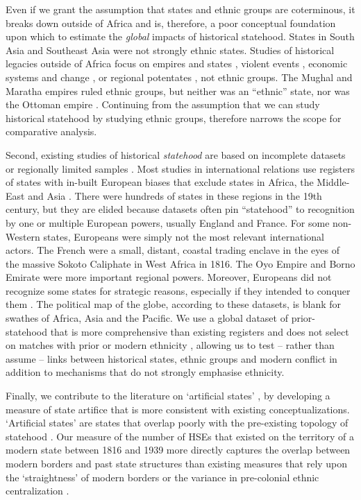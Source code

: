 Even if we grant the assumption that states and ethnic groups are coterminous,
it breaks down outside of Africa and is, therefore, a poor conceptual foundation
upon which to estimate the \textit{global} impacts of historical statehood.
States in South Asia and Southeast Asia were not strongly ethnic states. Studies
of historical legacies outside of Africa focus on empires and states
\citep{Acemoglu2011, Grosjean2011}, violent events \citep{Grosfeld2013},
economic systems and change \citep{Banerjee2005, Nunn2011}, or regional potentates \citep{Mazzuca2021}, not ethnic groups.
The Mughal and Maratha empires ruled ethnic groups, but neither was an
``ethnic'' state, nor was the Ottoman empire \citep{Richards1995, Ramusack2004,
Gordon1993}. Continuing from the assumption that we can study historical
statehood by studying ethnic groups, therefore narrows the scope for comparative
analysis.

Second, existing studies of historical \textit{statehood} are based on
incomplete datasets or regionally limited samples \citep{Besley2014,
Depetris-Chauvin2016, Dincecco2019, Michalopoulos2016, Nunn2008}. Most studies
in international relations use registers of states with in-built European biases
that exclude states in Africa, the Middle-East and Asia \citep{Sarkees2010,
Gleditsch1999}. There were hundreds of states in these regions in the 19th
century, but they are elided because datasets often pin “statehood” to
recognition by one or multiple European powers, usually England and France. For
some non-Western states, Europeans were simply not the most relevant
international actors. The French were a small, distant, coastal trading enclave
in the eyes of the massive Sokoto Caliphate in West Africa in 1816. The Oyo
Empire and Borno Emirate were more important regional powers. Moreover,
Europeans did not recognize some states for strategic reasons, especially if
they intended to conquer them \citep{Teorell2017}. The political map of the
globe, according to these datasets, is blank for swathes of Africa, Asia and the
Pacific. We use a global dataset of prior-statehood that is more comprehensive
than existing registers and does not select on matches with prior or modern
ethnicity \citep{Butcher2020}, allowing us to test -- rather than assume --
links between historical states, ethnic groups and modern conflict in addition
to mechanisms that do not strongly emphasise ethnicity. 

Finally, we contribute to the literature on `artificial states'
\citep{Alesina2011, Englebert2000, Herbst2014, Clapham1996}, by developing a
measure of state artifice that is more consistent with existing
conceptualizations. `Artificial states' are states that overlap poorly with the
pre-existing topology of statehood \citep{Alesina2011, Herbst2014}. Our measure
of the number of HSEs that existed on the territory
of a modern state between 1816 and 1939 more directly captures the overlap
between modern borders and past state structures than existing measures that
rely upon the `straightness' of modern borders \citep{Alesina2011} or the
variance in pre-colonial ethnic centralization \citep{Englebert2002}. 

